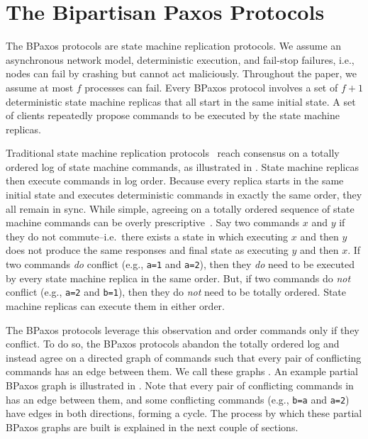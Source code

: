 \section{The Bipartisan Paxos Protocols}
The BPaxos protocols are state machine replication protocols. We assume an
asynchronous network model, deterministic execution, and fail-stop failures,
i.e., nodes can fail by crashing but cannot act maliciously. Throughout the
paper, we assume at most $f$ processes can fail. Every BPaxos protocol involves
a set of $f + 1$ deterministic state machine replicas that all start in the
same initial state. A set of clients repeatedly propose commands to be executed
by the state machine replicas.



Traditional state machine replication protocols~\cite{liskov2012viewstamped,
lamport1998part} reach consensus on a totally ordered log of state machine
commands, as illustrated in . State machine replicas then
execute commands in log order. Because every replica starts in the same initial
state and executes deterministic commands in exactly the same order,
they all remain in sync.
%
While simple, agreeing on a totally ordered sequence of state machine commands
can be overly prescriptive~\cite{lamport2005generalized, moraru2013there}. Say
two commands $x$ and $y$  if they do not commute--i.e.\ there
exists a state in which executing $x$ and then $y$ does not produce the same
responses and final state as executing $y$ and then $x$. If two commands
\emph{do} conflict (e.g., \texttt{a=1} and \texttt{a=2}), then they \emph{do}
need to be executed by every state machine replica in the same order. But, if
two commands do \emph{not} conflict (e.g., \texttt{a=2} and \texttt{b=1}), then
they do \emph{not} need to be totally ordered. State machine replicas can
execute them in either order.

The BPaxos protocols leverage this observation and order commands only if they
conflict. To do so, the BPaxos protocols abandon the totally ordered log and
instead agree on a directed graph of commands such that every pair of
conflicting commands has an edge between them. We call these graphs
. An example partial BPaxos graph is illustrated
in . Note that every pair of conflicting commands in
 has an edge between them, and some conflicting commands
(e.g., \texttt{b=a} and \texttt{a=2}) have edges in both directions, forming a
cycle. The process by which these partial BPaxos graphs are built is explained
in the next couple of sections.

